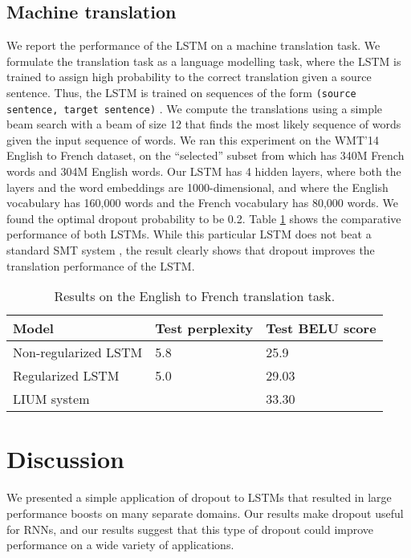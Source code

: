\documentclass{article}
\begin{document}
\subsection{Machine translation}
\label{sec:trans}

We report the performance of the LSTM on a machine translation task.
We formulate the translation task as a language modelling task, where
the LSTM is trained to assign high probability to the correct
translation given a source sentence.  Thus, the LSTM is trained on
sequences of the form \texttt{(source sentence, target sentence)}
\cite{mt_paper,cho2014learning}. We compute the translations using a
simple beam search with a beam of size 12 that finds the most likely
sequence of words given the input sequence of words.  We ran this
experiment on the WMT'14 English to French dataset, on the
``selected'' subset from \citet{wmt_joint} which has 340M French words
and 304M English words.  Our LSTM has 4 hidden layers, where both the
layers and the word embeddings are 1000-dimensional, and where the
English vocabulary has 160,000 words and the French vocabulary has
80,000 words. We found the optimal dropout probability to be 0.2.
Table \ref{tab:mt} shows the comparative performance of both LSTMs.
While this particular LSTM does not beat a standard SMT system
\cite{lium}, the result clearly shows that dropout improves the
translation performance of the LSTM.

\begin{table}[t]
  \small
  \centering
  \renewcommand{\arraystretch}{1.15}
  \begin{tabular}{lll}
    \hline
     Model & Test perplexity & Test BELU score \\
    \hline
    Non-regularized LSTM & 5.8 & 25.9 \\
    Regularized LSTM & 5.0 &  29.03 \\
    \hline
    LIUM system &  &  33.30 \\
    \hline
  \end{tabular}
  \caption{Results on the English to French translation task. }
  \label{tab:mt}
\end{table}



\section{Discussion}

We presented a simple application of dropout to LSTMs that resulted in
large performance boosts on many separate domains.  Our results make dropout
useful for RNNs, and our results suggest that this type of dropout could improve
performance on a wide variety of applications.






\end{document}
